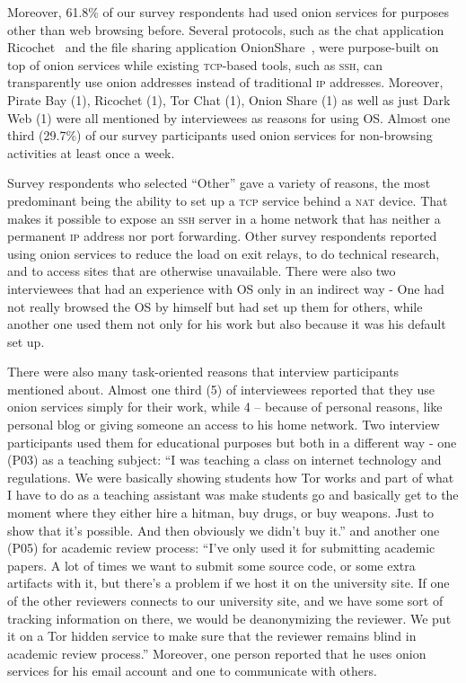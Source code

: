 Moreover, 61.8\% of our survey respondents had used onion services for purposes
other than web browsing before.  Several protocols, such as the chat application
Ricochet~\cite{ricochet} and the file sharing application
OnionShare~\cite{onionshare}, were purpose-built on top of onion services while
existing \textsc{tcp}-based tools, such as \textsc{ssh}, can transparently use
onion addresses instead of traditional \textsc{ip} addresses.  Moreover, Pirate Bay (1), Ricochet (1), Tor Chat (1), Onion Share (1) as well as just Dark Web (1) were all mentioned by interviewees as reasons for using OS.
Almost one third
(29.7\%) of our survey participants used onion services for non-browsing activities at
least once a week. 

Survey respondents who selected ``Other'' gave a variety of reasons, the most
predominant being the ability to set up a \textsc{tcp} service behind a
\textsc{nat} device.  That makes it possible to expose an \textsc{ssh} server in
a home network that has neither a permanent \textsc{ip} address nor port
forwarding.  Other survey respondents reported using onion services to reduce the load on exit relays, to do
technical research, and to access sites that are otherwise unavailable. There were also two interviewees that had an experience with OS only in an indirect way - One had not really browsed the OS by himself but had set up them for others, while another one used them not only for his work but also because it was his default set up.


There were also many task-oriented reasons that interview participants mentioned about. Almost one third (5) of interviewees reported that they use onion services simply for their work, while 4 – because of personal reasons, like personal blog or giving someone an access to his home network. Two interview participants used them for educational purposes but both in a different way - one (P03) as a teaching subject: “I was teaching a class on internet technology and regulations. We were basically showing students how Tor works and part of what I have to do as a teaching assistant was make students go and basically get to the moment where they either hire a hitman, buy drugs, or buy weapons. Just to show that it's possible. And then obviously we didn't buy it.” and another one (P05) for academic review process: “I've only used it for submitting academic papers. A lot of times we want to submit some source code, or some extra artifacts with it, but there's a problem if we host it on the university site. If one of the other reviewers connects to our university site, and we have some sort of tracking information on there, we would be deanonymizing the reviewer. We put it on a Tor hidden service to make sure that the reviewer remains blind in academic review process.” Moreover, one person reported that he uses onion services for his email account and one to communicate with others.


